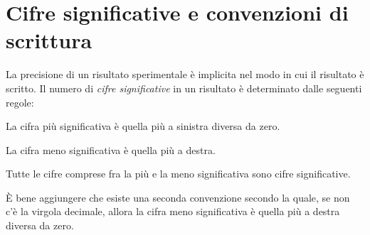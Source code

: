 \section{Cifre significative e convenzioni di scrittura}

 La precisione di un risultato sperimentale \`e
implicita nel modo in cui il risultato \`e scritto. Il numero di
{\itshape cifre significative} in un risultato \`e determinato dalle seguenti
regole:
\begin{numlist}
\item{
La cifra pi\`u significativa \`e quella pi\`u a sinistra diversa da zero.
}
\item{
La cifra meno significativa \`e quella pi\`u a destra.
}
\item{
Tutte le cifre comprese fra la pi\`u e la meno significativa
sono cifre significative.
}
\end{numlist}

\begin{exemplify}


\end{exemplify}

\noindent \`E bene aggiungere che esiste una seconda convenzione
 secondo la quale, se non c'\`e la virgola decimale, allora
la cifra meno significativa \`e quella pi\`u a destra diversa da zero.

\begin{exemplify}


\end{exemplify}

